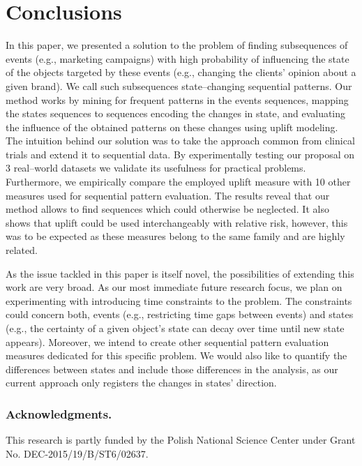 \documentclass[runningheads,a4paper]{llncs}
\begin{document}
\section{Conclusions}
\label{sec:conclusions}
In this paper, we presented a solution to the problem of finding subsequences of events (e.g., marketing campaigns) with high probability of influencing the state of the objects targeted by these events (e.g., changing the clients’ opinion about a given brand).
We call such subsequences state--changing sequential patterns.
Our method works by mining for frequent patterns in the events sequences, mapping the states sequences to sequences encoding the changes in state, and evaluating the influence of the obtained patterns on these changes using uplift modeling.
The intuition behind our solution was to take the approach common from clinical trials and extend it to sequential data.
By experimentally testing our proposal on 3 real--world datasets we validate its usefulness for practical problems.
Furthermore, we empirically compare the employed uplift measure with 10 other measures used for sequential pattern evaluation.
The results reveal that our method allows to find sequences which could otherwise be neglected.
It also shows that uplift could be used interchangeably with relative risk, however, this was to be expected as these measures belong to the same family and are highly related.

As the issue tackled in this paper is itself novel, the possibilities of extending this work are very broad.
As our most immediate future research focus, we plan on experimenting with introducing time constraints to the problem.
The constraints could concern both, events (e.g., restricting time gaps between events) and states (e.g., the certainty of a given object's state can decay over time until new state appears).
Moreover, we intend to create other sequential pattern evaluation measures dedicated for this specific problem.
We would also like to quantify the differences between states and include those differences in the analysis, as our current approach only registers the changes in states' direction.

\subsubsection*{Acknowledgments.} This research is partly funded by the Polish National Science Center under Grant No. DEC-2015/19/B/ST6/02637.



\end{document}

